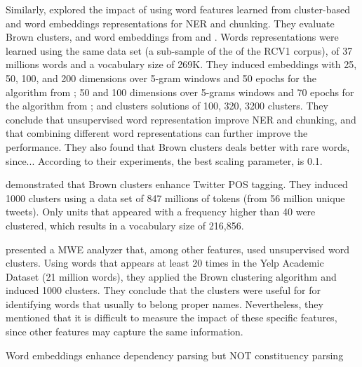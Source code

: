 \documentclass[11pt]{article}
\begin{document}
Similarly,  explored the impact of using word
features learned from cluster-based and word embeddings representations
for NER and chunking. 
They evaluate Brown clusters, and word embeddings from  
and . Words representations were learned using the same data set (a sub-sample of the of the RCV1 corpus), of 37 millions words and a vocabulary size of 269K.
They induced embeddings with 25, 50, 100, and 200 dimensions over 5-gram windows and 50 epochs for the algorithm from \cite{collobert2011natural}; 
50 and 100 dimensions over 5-grams windows and 70 epochs for the algorithm from \cite{Mnih2008}; and clusters solutions of 100, 320, 3200 clusters.
They conclude that unsupervised word representation improve NER and chunking, and that combining different word representations can further improve the performance.
They also found that Brown clusters deals better with rare words, since...
According to their experiments, the best scaling parameter, is 0.1.


 demonstrated that Brown clusters enhance Twitter POS tagging. 
They induced 1000 clusters using a data set of 847 millions of tokens (from 56 million unique tweets). Only units that appeared with a frequency higher than 40 were clustered, which results in a vocabulary size of 216,856.

 presented a MWE analyzer that, among other features,  used unsupervised word clusters. 
Using words that appears at least 20 times in the Yelp Academic Dataset (21 million words), they applied the Brown clustering algorithm and induced 1000 clusters. They conclude that the clusters were useful for 
for identifying words that usually to belong proper names.
Nevertheless, they mentioned that it is difficult to measure the impact
of these specific features, since other features may capture the same information.

Word embeddings enhance dependency parsing
\cite{Bansal+:2014} but NOT constituency parsing \cite{Andreas:Klein:2014}
\end{document}

